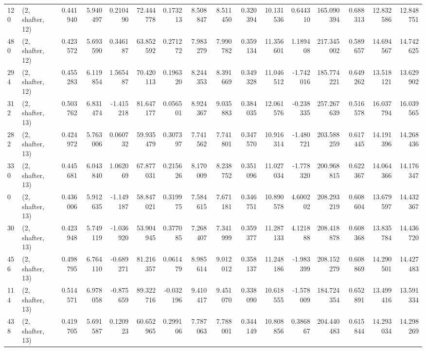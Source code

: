 \begin{tabular}{llrrrrrrrrrrrrrr}
120 &  (2, shafter, 12) &   0.441940 &   5.940497 &   0.210490 &    72.444778 &   0.173213 &   8.508847 &   8.511450 &  0.320394 &  10.131536 &   0.644310 &   165.090394 &  0.688313 &  12.832586 &  12.848751 \\
480 &  (2, shafter, 12) &   0.423572 &   5.693590 &   0.346187 &    63.852592 &   0.271272 &   7.983279 &   7.990782 &  0.359134 &  11.356601 &   1.189408 &   217.345002 &  0.589657 &  14.694567 &  14.742625 \\
294 &  (2, shafter, 12) &   0.455283 &   6.119854 &   1.565487 &    70.420113 &   0.196320 &   8.244353 &   8.391669 &  0.349328 &  11.046512 &  -1.742016 &   185.774221 &  0.649262 &  13.518121 &  13.629902 \\
312 &  (2, shafter, 13) &   0.503762 &   6.831474 &  -1.415218 &    81.647177 &   0.056501 &   8.924367 &   9.035883 &  0.384035 &  12.061576 &  -0.238335 &   257.267639 &  0.516578 &  16.037794 &  16.039565 \\
282 &  (2, shafter, 13) &   0.424972 &   5.763006 &   0.060732 &    59.935479 &   0.307397 &   7.741562 &   7.741801 &  0.347570 &  10.916314 &  -1.480721 &   203.588259 &  0.617445 &  14.191396 &  14.268436 \\
330 &  (2, shafter, 13) &   0.445681 &   6.043840 &   1.062069 &    67.877031 &   0.215626 &   8.170009 &   8.238752 &  0.351096 &  11.027034 &  -1.778320 &   200.968815 &  0.622367 &  14.064366 &  14.176347 \\
0   &  (2, shafter, 13) &   0.436006 &   5.912635 &  -1.149187 &    58.847021 &   0.319975 &   7.584615 &   7.671181 &  0.346751 &  10.890578 &   4.600202 &   208.293219 &  0.608604 &  13.679597 &  14.432367 \\
30  &  (2, shafter, 13) &   0.423948 &   5.749119 &  -1.036920 &    53.904945 &   0.377085 &   7.268407 &   7.341999 &  0.359377 &  11.287133 &   4.121888 &   208.418878 &  0.608368 &  13.835784 &  14.436720 \\
456 &  (2, shafter, 13) &   0.498795 &   6.764110 &  -0.689271 &    81.216357 &   0.061479 &   8.985614 &   9.012012 &  0.358137 &  11.248186 &  -1.983399 &   208.152279 &  0.608869 &  14.290501 &  14.427483 \\
114 &  (2, shafter, 13) &   0.514571 &   6.978058 &  -0.875659 &    89.322716 &  -0.032196 &   9.410417 &   9.451070 &  0.338090 &  10.618555 &  -1.578009 &   184.724354 &  0.652891 &  13.499416 &  13.591334 \\
438 &  (2, shafter, 13) &   0.419705 &   5.691587 &   0.120923 &    60.652965 &   0.299106 &   7.787063 &   7.788001 &  0.344149 &  10.808856 &   0.386867 &   204.440483 &  0.615844 &  14.293034 &  14.298269 \\

\end{tabular}

